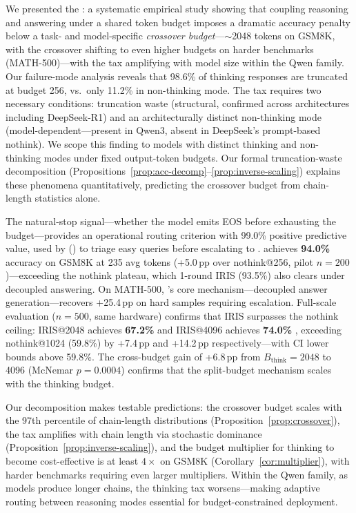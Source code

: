 
We presented the \couplingtax{}: a systematic empirical study showing that coupling reasoning and answering under a shared token budget imposes a dramatic accuracy penalty below a task- and model-specific \emph{crossover budget}---${\sim}$2048 tokens on GSM8K, with the crossover shifting to even higher budgets on harder benchmarks (MATH-500)---with the tax amplifying with model size within the Qwen family.
Our failure-mode analysis reveals that 98.6\% of thinking responses are truncated at budget 256, vs.\ only 11.2\% in non-thinking mode.
The tax requires two necessary conditions: truncation waste (structural, confirmed across architectures including DeepSeek-R1) and an architecturally distinct non-thinking mode (model-dependent---present in Qwen3, absent in DeepSeek's prompt-based nothink).
We scope this finding to models with distinct thinking and non-thinking modes under fixed output-token budgets.
Our formal truncation-waste decomposition (Propositions~\ref{prop:acc-decomp}--\ref{prop:inverse-scaling}) explains these phenomena quantitatively, predicting the crossover budget from chain-length statistics alone.

The natural-stop signal---whether the model emits EOS before exhausting the budget---provides an operational routing criterion with 99.0\% positive predictive value, used by \method{} (\fullmethod{}) to triage easy queries before escalating to \splitbudget{}.
\method{} achieves \textbf{94.0\%} accuracy on GSM8K at 235 avg tokens (+5.0\,pp over nothink@256, pilot $n{=}200$)---exceeding the nothink plateau, which 1-round IRIS (93.5\%) also clears under decoupled answering.
On MATH-500, \method{}'s core mechanism---decoupled answer generation---recovers +25.4\,pp on hard samples requiring escalation.
Full-scale evaluation ($n{=}500$, same hardware) confirms that IRIS surpasses the nothink ceiling: IRIS@2048 achieves \textbf{67.2\%}  and IRIS@4096 achieves \textbf{74.0\%} , exceeding nothink@1024 (59.8\%) by +7.4\,pp and +14.2\,pp respectively---with CI lower bounds above 59.8\%.
The cross-budget gain of +6.8\,pp from $B_{\text{think}}{=}2048$ to 4096 (McNemar $p{=}0.0004$) confirms that the split-budget mechanism scales with the thinking budget.

Our decomposition makes testable predictions: the crossover budget scales with the 97th percentile of chain-length distributions (Proposition~\ref{prop:crossover}), the tax amplifies with chain length via stochastic dominance (Proposition~\ref{prop:inverse-scaling}), and the budget multiplier for thinking to become cost-effective is at least $4\times$ on GSM8K (Corollary~\ref{cor:multiplier}), with harder benchmarks requiring even larger multipliers.
Within the Qwen family, as models produce longer chains, the thinking tax worsens---making adaptive routing between reasoning modes essential for budget-constrained deployment.


